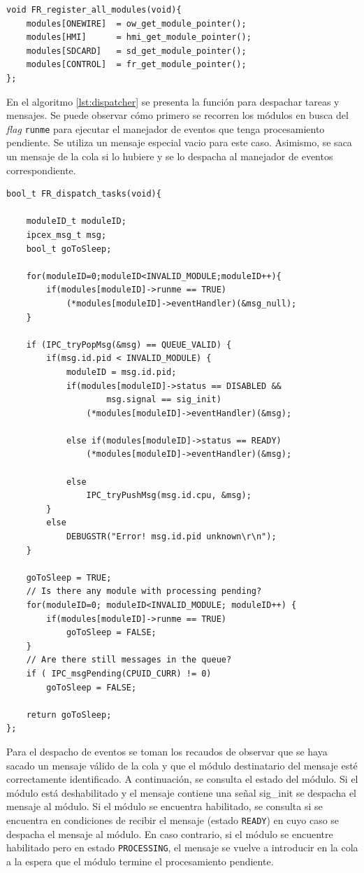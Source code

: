 \begin{lstlisting}[caption={Función para registrar los módulos del sistema.},label={lst:register}]
void FR_register_all_modules(void){
	modules[ONEWIRE]  = ow_get_module_pointer();
	modules[HMI]      = hmi_get_module_pointer();
	modules[SDCARD]   = sd_get_module_pointer();
	modules[CONTROL]  = fr_get_module_pointer();
};
\end{lstlisting}

En el algoritmo \ref{lst:dispatcher} se presenta la función para despachar tareas y mensajes.  Se puede observar cómo primero se recorren los módulos en busca del \textit{flag} \texttt{runme} para ejecutar el manejador de eventos que tenga procesamiento pendiente. Se utiliza un mensaje especial vacio para este caso. Asimismo, se saca un mensaje de la cola si lo hubiere y se lo despacha al manejador de eventos correspondiente.

\vspace{10px}
\begin{lstlisting}[caption={Función para despachar tareas y mensajes.},label={lst:dispatcher}]
bool_t FR_dispatch_tasks(void){

	moduleID_t moduleID;
	ipcex_msg_t msg;
	bool_t goToSleep;

	for(moduleID=0;moduleID<INVALID_MODULE;moduleID++){
		if(modules[moduleID]->runme == TRUE)
			(*modules[moduleID]->eventHandler)(&msg_null);
	}

	if (IPC_tryPopMsg(&msg) == QUEUE_VALID) {
		if(msg.id.pid < INVALID_MODULE) {
			moduleID = msg.id.pid;
			if(modules[moduleID]->status == DISABLED && 
					msg.signal == sig_init)
				(*modules[moduleID]->eventHandler)(&msg);

			else if(modules[moduleID]->status == READY)
				(*modules[moduleID]->eventHandler)(&msg);

			else
				IPC_tryPushMsg(msg.id.cpu, &msg);
		}
		else 
			DEBUGSTR("Error! msg.id.pid unknown\r\n");
	}

	goToSleep = TRUE;
	// Is there any module with processing pending?
	for(moduleID=0; moduleID<INVALID_MODULE; moduleID++) {
		if(modules[moduleID]->runme == TRUE)
			goToSleep = FALSE;
	}
	// Are there still messages in the queue?
	if ( IPC_msgPending(CPUID_CURR) != 0)
		goToSleep = FALSE;

	return goToSleep;
};
\end{lstlisting}

Para el despacho de eventos se toman los recaudos de observar que se haya sacado un mensaje válido de la cola y que el módulo destinatario del mensaje esté correctamente identificado.  A continuación, se consulta el estado del módulo.  Si el módulo está deshabilitado y el mensaje contiene una señal sig\_init se despacha el mensaje al módulo. Si el módulo se encuentra habilitado, se consulta si se encuentra en condiciones de recibir el mensaje (estado \texttt{READY}) en cuyo caso se despacha el mensaje al módulo.  En caso contrario, si el módulo se encuentre habilitado pero en estado \texttt{PROCESSING}, el mensaje se vuelve a introducir en la cola a la espera que el módulo termine el procesamiento pendiente.

